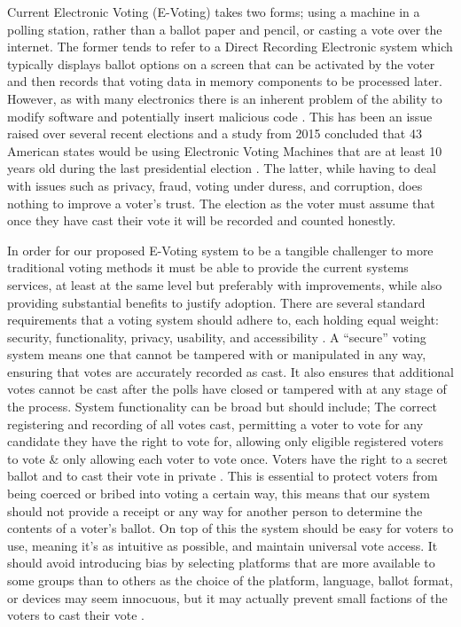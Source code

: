 \documentclass{article}
\begin{document}
Current Electronic Voting (E-Voting) takes two forms; using a machine in a polling station, rather than a ballot paper and pencil, or casting a vote over the internet. The former tends to refer to a Direct Recording Electronic system which typically displays ballot options on a screen that can be activated by the voter and then records that voting data in memory components to be processed later. However, as with many electronics there is an inherent problem of the ability to modify software and potentially insert malicious code \citep{44_wyndham_chen_das_2016}. This has been an issue raised over several recent elections and a study from 2015 concluded that 43 American states would be using Electronic Voting Machines that are at least 10 years old during the last presidential election \citep{45_holmes_2016}. The latter, while having to deal with issues such as privacy, fraud, voting under duress, and corruption, does nothing to improve a voter's trust. The election as the voter must assume that once they have cast their vote it will be recorded and counted honestly.

In order for our proposed E-Voting system to be a tangible challenger to more traditional voting methods it must be able to provide the current systems services, at least at the same level but preferably with improvements, while also providing substantial benefits to justify adoption. There are several standard requirements that a voting system should adhere to, each holding equal weight: security, functionality, privacy, usability, and accessibility \citep{46_voting_system_standards_testing_and_certification_2016}. A ``secure'' voting system means one that cannot be tampered with or manipulated in any way, ensuring that votes are accurately recorded as cast. It also ensures that additional votes cannot be cast after the polls have closed or tampered with at any stage of the process. System functionality can be broad but should include; The correct registering and recording of all votes cast, permitting a voter to vote for any candidate they have the right to vote for, allowing only eligible registered voters to vote \& only allowing each voter to vote once. Voters have the right to a secret ballot and to cast their vote in private \citep{46_voting_system_standards_testing_and_certification_2016}. This is essential to protect voters from being coerced or bribed into voting a certain way, this means that our system should not provide a receipt or any way for another person to determine the contents of a voter's ballot. On top of this the system should be easy for voters to use, meaning it's as intuitive as possible, and maintain universal vote access.  It should avoid introducing bias by selecting platforms that are more available to some groups than to others as the choice of the platform, language, ballot format, or devices may seem innocuous, but it may actually prevent small factions of the voters to cast their vote \citep{47_petride_2016}.
\end{document}
